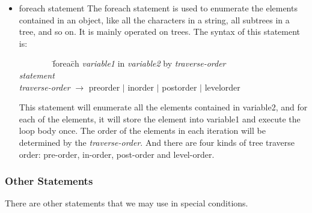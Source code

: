 \documentclass[12pt,psfig,a4]{article}
\begin{document}
\begin{itemize}
\item foreach statement
The foreach statement is used to enumerate the elements contained in an object, like all the characters in a string, all subtrees in a tree, and so on. It is mainly operated on trees. The syntax of this statement is:

\begin{code}
\begin{tabbing}
~~~~~~~~\= forea\= ch \textsl{variable1} in \textsl{variable2} by \textsl{traverse-order} \\
\> \> \textsl{statement} \\
\> \textsl{traverse-order} $\rightarrow$ preorder $\mid$ inorder $\mid$ postorder $\mid$ levelorder
\end{tabbing}
\end{code}

This statement will enumerate all the elements contained in variable2, and for each of the elements, it will store the element into variable1 and execute the loop body once. The order of the elements in each iteration will be determined by the \textsl{traverse-order}. And there are four kinds of tree traverse order: pre-order, in-order, post-order and level-order.

\end{itemize}


\subsubsection{Other Statements}
There are other statements that we may use in special conditions.
\end{document}
